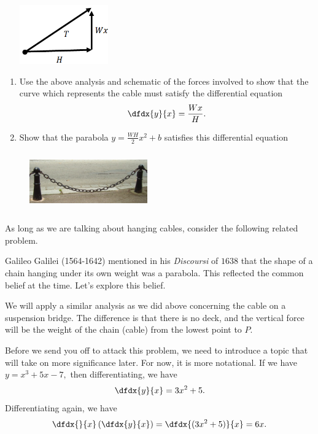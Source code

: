 \begin{embeddedproblem}{}
\centerline{\includegraphics*[height=1in,width=2in]{Figures/MackinacBridge3}}
    \begin{enumerate}[label={\bf{}(\alph*)}]
    \item Use the above analysis and  schematic of the
      forces involved
to show that the curve which
      represents the cable must satisfy the differential equation
       $$\dfdx{y}{x}=\frac{Wx}{H}.$$
    \item Show that the parabola  $y=\frac{WH}{2} x^2+b$  satisfies this differential equation
    \end{enumerate}
\end{embeddedproblem}

\begin{figure}
\captionsetup{labelformat=empty}
\centerline{\includegraphics*[height=1in,width=2in]{Figures/HangingChain1}}
\label{fig:}
\end{figure}
As long as we are talking about hanging cables, consider the following
related problem.

Galileo Galilei (1564-1642) mentioned in his {\it{}Discoursi} of $1638$ that
the shape of a chain hanging under its own weight was a parabola.
This reflected the common belief at the time.  Let's explore this
belief.


We will apply a similar analysis as we did above concerning the cable
on a suspension bridge.  The difference is that there is no deck, and
the vertical force will be the weight of the chain (cable) from the
lowest point to $P.$

Before we send you off to attack this problem, we need to introduce a
topic that will take on more significance later.  For now, it is more
notational.  If we have $y=x^3+5x-7,$ then differentiating, we have
$$
\dfdx{y}{x}=3x^2+5.
$$
Differentiating again, we have
$$
\dfdx{}{x}\left(\dfdx{y}{x}\right)=\dfdx{(3x^2+5)}{x}=6x.
$$


